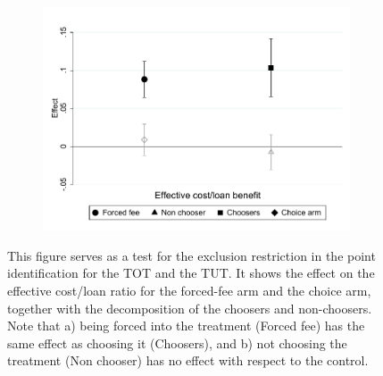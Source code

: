 \documentclass[oneside,11pt]{article}
\begin{document}
\begin{figure}[H]
     \caption{Exclusion restriction}
     \label{exclusion_restriction}
    \begin{center}
    \begin{subfigure}{0.6\textwidth}
        \centering
        \includegraphics[width=\textwidth]{Figuras/exclusion_restriction.pdf}
    \end{subfigure}
    \end{center}
    \scriptsize This figure serves as a test for the exclusion restriction in the point identification for the TOT and the TUT. It shows the effect on the effective cost/loan ratio for the forced-fee arm and the choice arm, together with the decomposition of the choosers and non-choosers. Note that a) being forced into the treatment (Forced fee) has the same effect as choosing it (Choosers), and b) not choosing the treatment (Non chooser) has no effect with respect to the control.
    
\end{figure}


\newpage 
\end{document}

